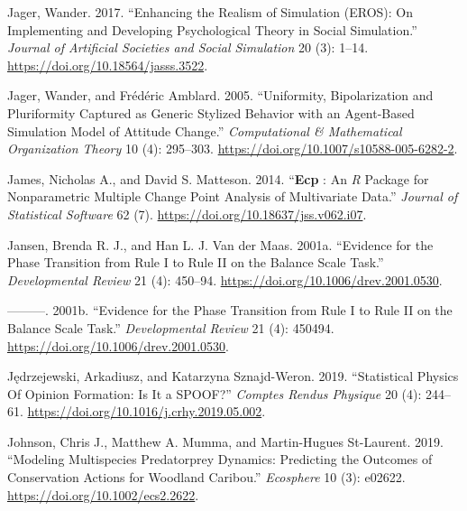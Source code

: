 \documentclass[
  letterpaper,
]{scrbook}
\newlength{\cslhangindent}
\newlength{\cslentryspacingunit} %
\newenvironment{CSLReferences}[2] %
 {%
  \setlength{\parindent}{0pt}
  \ifodd #1
  \let\oldpar\par
  \def\par{\hangindent=\cslhangindent\oldpar}
  \fi
  \setlength{\parskip}{#2\cslentryspacingunit}
 }%
 {}
\begin{document}
\begin{CSLReferences}{1}{0}
\leavevmode{}%
Jager, Wander. 2017. {``Enhancing the {Realism} of {Simulation}
({EROS}): {On Implementing} and {Developing Psychological Theory} in
{Social Simulation}.''} \emph{Journal of Artificial Societies and Social
Simulation} 20 (3): 1--14. \url{https://doi.org/10.18564/jasss.3522}.

\leavevmode{}%
Jager, Wander, and Frédéric Amblard. 2005. {``Uniformity,
{Bipolarization} and {Pluriformity Captured} as {Generic Stylized
Behavior} with an {Agent-Based Simulation Model} of {Attitude
Change}.''} \emph{Computational \& Mathematical Organization Theory} 10
(4): 295--303. \url{https://doi.org/10.1007/s10588-005-6282-2}.

\leavevmode{}%
James, Nicholas A., and David S. Matteson. 2014. {``{\textbf{Ecp}} :
{An} {\emph{R}} {Package} for {Nonparametric Multiple Change Point
Analysis} of {Multivariate Data}.''} \emph{Journal of Statistical
Software} 62 (7). \url{https://doi.org/10.18637/jss.v062.i07}.

\leavevmode{}%
Jansen, Brenda R. J., and Han L. J. Van der Maas. 2001a. {``Evidence for
the {Phase Transition} from {Rule I} to {Rule II} on the {Balance Scale
Task}.''} \emph{Developmental Review} 21 (4): 450--94.
\url{https://doi.org/10.1006/drev.2001.0530}.

\leavevmode{}%
---------. 2001b. {``Evidence for the Phase Transition from Rule I to
Rule II on the Balance Scale Task.''} \emph{Developmental Review} 21
(4): 450494. \url{https://doi.org/10.1006/drev.2001.0530}.

\leavevmode{}%
Jędrzejewski, Arkadiusz, and Katarzyna Sznajd-Weron. 2019.
{``Statistical {Physics Of Opinion Formation}: {Is} It a {SPOOF}?''}
\emph{Comptes Rendus Physique} 20 (4): 244--61.
\url{https://doi.org/10.1016/j.crhy.2019.05.002}.

\leavevmode{}%
Johnson, Chris J., Matthew A. Mumma, and Martin-Hugues St-Laurent. 2019.
{``Modeling Multispecies Predator\textendash prey Dynamics: Predicting
the Outcomes of Conservation Actions for Woodland Caribou.''}
\emph{Ecosphere} 10 (3): e02622.
\url{https://doi.org/10.1002/ecs2.2622}.


\end{CSLReferences}
\end{document}
